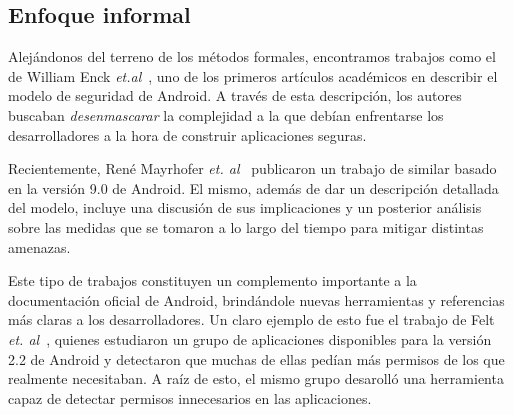 \subsection*{Enfoque informal}

Alejándonos del terreno de los métodos formales, encontramos trabajos como el de
William Enck \textit{et.al}~\cite{enck}, uno de los primeros artículos académicos
en describir el modelo de seguridad de Android. A través de esta descripción, los
autores buscaban \textit{desenmascarar} la complejidad a la que debían enfrentarse
%
%
los desarrolladores a la hora de construir aplicaciones seguras.

Recientemente, René Mayrhofer \textit{et. al}~\cite{mayrhofer} publicaron un
%
%
trabajo de similar basado en la versión 9.0 de Android. El mismo, además de dar
un descripción detallada del modelo, incluye una discusión de sus implicaciones
y un posterior análisis sobre las medidas que se tomaron a lo largo del tiempo
para mitigar distintas amenazas.

Este tipo de trabajos constituyen un complemento importante a la documentación
oficial de Android,
%
%
brindándole nuevas herramientas y referencias más claras a los desarrolladores.
Un claro ejemplo de esto fue el trabajo de Felt \textit{et. al}~\cite{felt}, quienes
estudiaron un grupo de aplicaciones disponibles para la versión 2.2 de Android y
detectaron que muchas de ellas pedían más permisos de los que realmente necesitaban.
A raíz de esto, el mismo grupo desarolló una herramienta capaz de detectar permisos
innecesarios en las aplicaciones.
%
%
